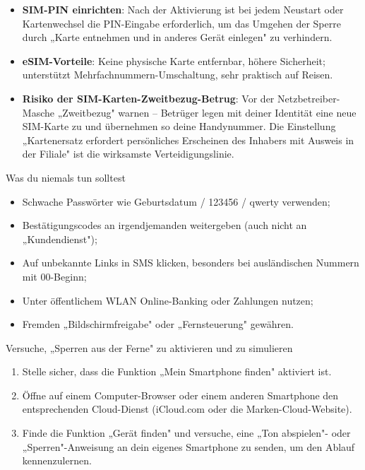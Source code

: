 \begin{itemize}
  \item \textbf{SIM-PIN einrichten}: Nach der Aktivierung ist bei jedem Neustart oder Kartenwechsel die PIN-Eingabe erforderlich, um das Umgehen der Sperre durch „Karte entnehmen und in anderes Gerät einlegen" zu verhindern.
  \item \textbf{eSIM-Vorteile}: Keine physische Karte entfernbar, höhere Sicherheit; unterstützt Mehrfachnummern-Umschaltung, sehr praktisch auf Reisen.
  \item \textbf{Risiko der SIM-Karten-Zweitbezug-Betrug}: Vor der Netzbetreiber-Masche „Zweitbezug" warnen – Betrüger legen mit deiner Identität eine neue SIM-Karte zu und übernehmen so deine Handynummer. Die Einstellung „Kartenersatz erfordert persönliches Erscheinen des Inhabers mit Ausweis in der Filiale" ist die wirksamste Verteidigungslinie.
\end{itemize}

\begin{tcbwarn}{Was du niemals tun solltest}
\begin{itemize}
  \item Schwache Passwörter wie Geburtsdatum / 123456 / qwerty verwenden;
  \item Bestätigungscodes an irgendjemanden weitergeben (auch nicht an „Kundendienst");
  \item Auf unbekannte Links in SMS klicken, besonders bei ausländischen Nummern mit 00-Beginn;
  \item Unter öffentlichem WLAN Online-Banking oder Zahlungen nutzen;
  \item Fremden „Bildschirmfreigabe" oder „Fernsteuerung" gewähren.
\end{itemize}

\end{tcbwarn}

\begin{tcbpractice}{Versuche, „Sperren aus der Ferne" zu aktivieren und zu simulieren}
\begin{enumerate}
  \item Stelle sicher, dass die Funktion „Mein Smartphone finden" aktiviert ist.
  \item Öffne auf einem Computer-Browser oder einem anderen Smartphone den entsprechenden Cloud-Dienst (iCloud.com oder die Marken-Cloud-Website).
  \item Finde die Funktion „Gerät finden" und versuche, eine „Ton abspielen"- oder „Sperren"-Anweisung an dein eigenes Smartphone zu senden, um den Ablauf kennenzulernen.
\end{enumerate}

\end{tcbpractice}
